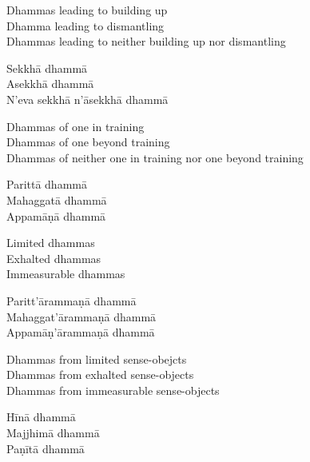 \begin{english-verses}
  Dhammas leading to building up\\
  Dhamma leading to dismantling\\
  Dhammas leading to neither building up nor dismantling
\end{english-verses}

\begin{pali-hang-continued}
  Sekkhā dhammā\\
  Asekkhā dhammā\\
  N'eva sekkhā n'āsekkhā dhammā
\end{pali-hang-continued}

\begin{english-verses}
  Dhammas of one in training\\
  Dhammas of one beyond training\\
  Dhammas of neither one in training nor one beyond training
\end{english-verses}

\begin{pali-hang-continued}
  Parittā dhammā\\
  Mahaggatā dhammā\\
  Appamāṇā dhammā
\end{pali-hang-continued}

\begin{english-verses}
  Limited dhammas\\
  Exhalted dhammas\\
  Immeasurable dhammas
\end{english-verses}

\begin{pali-hang-continued}
  Paritt'ārammaṇā dhammā\\
  Mahaggat'ārammaṇā dhammā\\
  Appamāṇ'ārammaṇā dhammā
\end{pali-hang-continued}

\begin{english-verses}
  Dhammas from limited sense-obejcts\\
  Dhammas from exhalted sense-objects\\
  Dhammas from immeasurable sense-objects
\end{english-verses}

\begin{pali-hang-continued}
  Hīnā dhammā\\
  Majjhimā dhammā\\
  Paṇītā dhammā
\end{pali-hang-continued}

